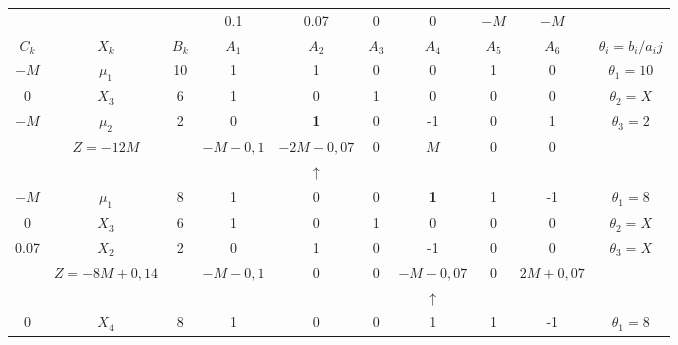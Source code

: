     \begin{tabular}{cccccccccc}
    \hline
    \hline
            &         &         & 0.1     & 0.07    & 0       & 0       & $-M$    & $-M$    &  \bigstrut[t]\\
    $C_k$   & $X_k$   & $B_k$   & $A_1$   & $A_2$   & $A_3$   & $A_4$   & $A_5$   & $A_6$   & $\theta_i = b_i/a_ij$ \\
    $-M$    & $\mu_1$ & 10      & 1       & 1       & 0       & 0       & 1       & 0       & $\theta_1 = 10$ \\
    0       & $X_3$   & 6       & 1       & 0       & 1       & 0       & 0       & 0       & $\theta_2 = X$ \\
    $-M$    & \textcolor[rgb]{ 1,  0,  0}{\boldmath{}\textbf{$\mu_2$}\unboldmath{}} & 2       & 0       & \textbf{1} & 0       & -1      & 0       & 1       & \boldmath{}\textbf{$\theta_3 = 2$}\unboldmath{} \bigstrut[b]\\
    \hline
            & $Z=-12M$ &         & $-M-0,1$ & \textcolor[rgb]{ 0,  .439,  .753}{\boldmath{}\textbf{$-2M-0,07$}\unboldmath{}} & 0       & $M$     & 0       & 0       &  \bigstrut\\
    \hline
    \hline
            &         &         &         & $\uparrow$ &         &         &         &         &  \bigstrut\\
    \hline
    \hline
    $-M$    & \textcolor[rgb]{ 1,  0,  0}{\boldmath{}\textbf{$\mu_1$}\unboldmath{}} & 8       & 1       & 0       & 0       & \textbf{1} & 1       & -1      & \boldmath{}\textbf{$\theta_1 = 8$}\unboldmath{} \bigstrut[t]\\
    0       & $X_3$   & 6       & 1       & 0       & 1       & 0       & 0       & 0       & $\theta_2 = X$ \\
    0.07    & $X_2$   & 2       & 0       & 1       & 0       & -1      & 0       & 0       & $\theta_3 = X$ \bigstrut[b]\\
    \hline
            & $Z=-8M+0,14$ &         & $-M-0,1$ & 0       & 0       & \textcolor[rgb]{ 0,  .439,  .753}{\boldmath{}\textbf{$-M-0,07$}\unboldmath{}} & 0       & $2M+0,07$ &  \bigstrut\\
    \hline
    \hline
            &         &         &         &         &         & $\uparrow$ &         &         &  \bigstrut\\
    \hline
    \hline
    0       & $X_4$   & 8       & 1       & 0       & 0       & 1       & 1       & -1      & $\theta_1 = 8$ \bigstrut[t]\\

\end{tabular}
